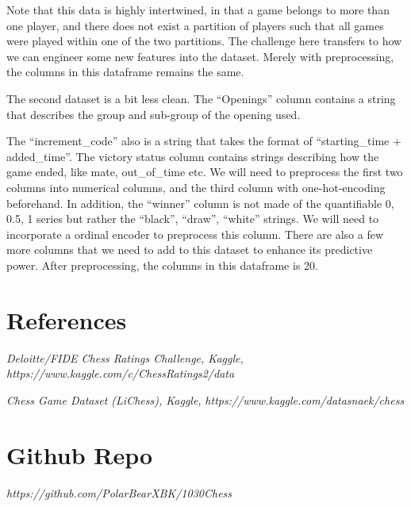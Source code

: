\documentclass[12pt, letterpaper]{article}
\begin{document}
\begin{multicols}{2}
Note that this data is highly intertwined, in that a game belongs to more than one player, and there does not exist a partition of players such that all games were played within one of the two partitions.
The challenge here transfers to how we can engineer some new features into the dataset. Merely with preprocessing, the columns in this dataframe remains the same.

The second dataset is a bit less clean. The “Openings” column contains a string that describes the group and sub-group of the opening used.

The “increment\_code” also is a string that takes the format of “starting\_time + added\_time”. The victory status column contains strings describing how the game ended, like mate, out\_of\_time etc. We will need to preprocess the first two columns into numerical columns, and the third column with one-hot-encoding beforehand. In addition, the “winner” column is not made of the quantifiable 0, 0.5, 1 series but rather the “black”, “draw”, “white” strings. We will need to incorporate a ordinal encoder to preprocess this column. There are also a few more columns that we need to add to this dataset to enhance its predictive power. After preprocessing, the columns in this dataframe is 20.


\section*{References}
\begin{small}
\begin{flushleft}
	\textit{Deloitte/FIDE Chess Ratings Challenge, Kaggle,}
	\textit{https://www.kaggle.com/c/ChessRatings2/data}
	
	\textit{Chess Game Dataset (LiChess), Kaggle,} 
	\textit{https://www.kaggle.com/datasnaek/chess}
\end{flushleft}
\end{small}


\section*{Github Repo}
	\textit{https://github.com/PolarBearXBK/1030Chess}
\end{multicols}	

\end{document}
